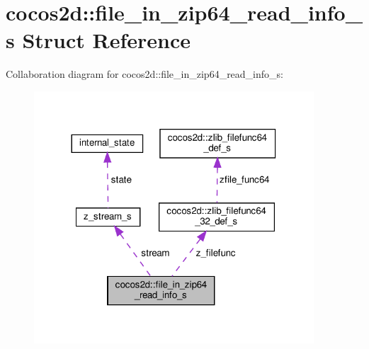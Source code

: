 \hypertarget{structcocos2d_1_1file__in__zip64__read__info__s}{}\section{cocos2d\+:\+:file\+\_\+in\+\_\+zip64\+\_\+read\+\_\+info\+\_\+s Struct Reference}
\label{structcocos2d_1_1file__in__zip64__read__info__s}


Collaboration diagram for cocos2d\+:\+:file\+\_\+in\+\_\+zip64\+\_\+read\+\_\+info\+\_\+s\+:
\nopagebreak
\begin{figure}[H]
\begin{center}
\leavevmode
\includegraphics[width=296pt]{structcocos2d_1_1file__in__zip64__read__info__s__coll__graph}
\end{center}
\end{figure}
